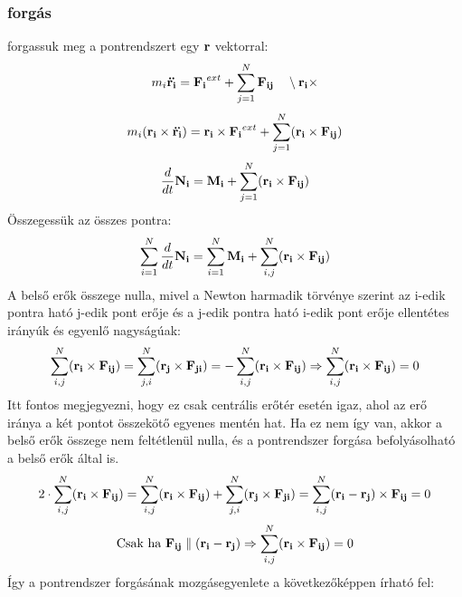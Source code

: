 \documentclass[../main.tex]{subfiles}
\begin{document}
\subsubsection{forgás}
forgassuk meg a pontrendszert egy $\bold{r}$ vektorral:
\begin{equation}
    m_i \bold{\ddot{r_i}} = \bold{F_i}^{ext} + \sum_{j=1}^{N} \bold{F_{ij}} \quad  \setminus \bold{r_i} \times
\end{equation}
\begin{equation}
    m_i (\bold{r_i} \times \bold{\ddot{r_i}}) = \bold{r_i} \times \bold{F_i}^{ext} + \sum_{j=1}^{N} (\bold{r_i} \times \bold{F_{ij}})
\end{equation}
\begin{equation}
    \frac{d}{dt} \bold{N_i} = \bold{M_i} + \sum_{j=1}^{N} (\bold{r_i} \times \bold{F_{ij}})
\end{equation}
Összegessük az összes pontra:
\begin{equation}
    \sum_{i=1}^{N} \frac{d}{dt} \bold{N_i} = \sum_{i=1}^{N} \bold{M_i} + \sum_{i,j}^{N} (\bold{r_i} \times \bold{F_{ij}})
\end{equation}
A belső erők összege nulla, mivel a Newton harmadik törvénye szerint az i-edik pontra ható j-edik pont erője és a j-edik pontra ható i-edik pont erője ellentétes irányúk és egyenlő nagyságúak:
\begin{equation}
    \sum_{i,j}^{N} (\bold{r_i} \times \bold{F_{ij}}) = \sum_{j,i}^{N} (\bold{r_j} \times \bold{F_{ji}}) = -\sum_{i,j}^{N} (\bold{r_i} \times \bold{F_{ij}}) \Rightarrow \sum_{i,j}^{N} (\bold{r_i} \times \bold{F_{ij}}) = 0
\end{equation}
Itt fontos megjegyezni, hogy ez csak centrális erőtér esetén igaz, ahol az erő iránya a két pontot összekötő egyenes mentén hat. Ha ez nem így van, akkor a belső erők összege nem feltétlenül nulla,
és a pontrendszer forgása befolyásolható a belső erők által is. 
\begin{equation}
    2 \cdot \sum_{i,j}^{N} (\bold{r_i} \times \bold{F_{ij}}) = \sum_{i,j}^{N} (\bold{r_i} \times \bold{F_{ij}}) + \sum_{j,i}^{N} (\bold{r_j} \times \bold{F_{ji}}) = \sum_{i,j}^{N} (\bold{r_i} - \bold{r_j}) \times \bold{F_{ij}} = 0
\end{equation}
\begin{equation}
    \text{Csak ha } \bold{F_{ij}} \parallel (\bold{r_i} - \bold{r_j}) \Rightarrow \sum_{i,j}^{N} (\bold{r_i} \times \bold{F_{ij}}) = 0
\end{equation}
Így a pontrendszer forgásának mozgásegyenlete a következőképpen írható fel:
\end{document}
